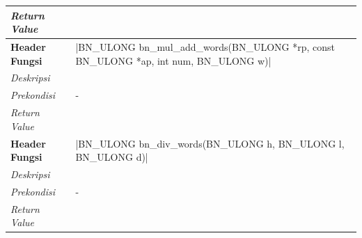 \begin{table}[h]
\begin{tabular}{R{2.8cm}L{10.5cm}}
          \textit{Return Value}  &
          \\ \bottomrule
          \textbf{Header Fungsi} & |BN_ULONG bn_mul_add_words(BN_ULONG *rp, const BN_ULONG *ap, int num, BN_ULONG w)| \\ \midrule
          \textit{Deskripsi}     &                                                                                    \\
          \textit{Prekondisi}    & -                                                                                  \\
          \textit{Return Value}  &
          \\ \bottomrule
          \textbf{Header Fungsi} & |BN_ULONG bn_div_words(BN_ULONG h, BN_ULONG l, BN_ULONG d)|                        \\ \midrule
          \textit{Deskripsi}     &                                                                                    \\
          \textit{Prekondisi}    & -                                                                                  \\
          \textit{Return Value}  &
          \\ \bottomrule
        \end{tabular}

      \end{table}
